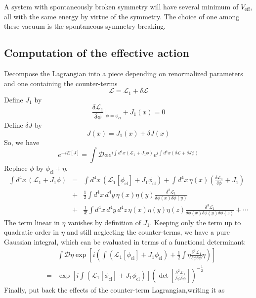A system with spontaneously broken symmetry will have several minimum of $V_{\mathrm{eff}}$, all with the same energy by virtue of the symmetry. The choice of one among these vacuum is the spontaneous symmetry breaking.

\subsection{Computation of the effective action}
\noindent
Decompose the Lagrangian into a piece depending on renormalized parameters and one containing the counter-terms
\[\mathcal{L} = \mathcal{L}_1 + \delta \mathcal{L}\]
Define $J_1$ by
\[\frac{\delta \mathcal{L}_1}{\delta \phi} |_{\phi = \phi_{\mathrm{cl}}} + J_1(x) = 0\]
Define $\delta J$ by
\[J(x) = J_1(x) + \delta J(x)\]
So, we have
\[e^{-iE[J]} = \int \mathcal{D}\phi e^{i\int d^4x (\mathcal{L}_1 + J_1\phi)} e^{i\int d^4x (\delta \mathcal{L} + \delta J \phi)}\]
Replace $\phi$ by $\phi_{\mathrm{cl}}+\eta$,
\begin{eqnarray}
\int d^4x \, (\mathcal{L}_1 + J_1\phi) &=& \int d^4x \, (\mathcal{L}_1[\phi_{\mathrm{cl}}] + J_1\phi_{\mathrm{cl}}) + \int d^4x \, \eta(x) \left( \frac{\delta \mathcal{L}_1}{\delta \phi} + J_1 \right) \nonumber \\
&+& \frac{1}{2} \int d^4x \, d^4y \, \eta(x) \eta(y) \frac{\delta^2 \mathcal{L}_1}{\delta \phi(x) \delta \phi(y)} \nonumber \\
&+& \frac{1}{3!} \int d^4x \, d^4y \, d^4z \, \eta(x) \eta(y) \eta(z) \frac{\delta^3 \mathcal{L}_1}{\delta \phi(x) \delta \phi(y) \delta \phi(z)} + \cdots \nonumber
\end{eqnarray}
The term linear in $\eta$ vanishes by definition of $J_1$.  Keeping only the term up to quadratic order in $\eta$ and still neglecting the counter-terms, we have a pure Gaussian integral, which can be evaluated in terms of a functional determinant:
\begin{eqnarray}
&&\int \mathcal{D}\eta \exp \left[ i \left( \int ( \mathcal{L}_1 [\phi_{\mathrm{cl}}] + J_1\phi_{\mathrm{cl}} ) +  \frac{1}{2} \int \eta \frac{\delta^2 \mathcal{L}_1}{\delta \phi \delta \phi} \eta \right) \right] \nonumber \\
&=& \exp \left[ i \int ( \mathcal{L}_1 [\phi_{\mathrm{cl}}] + J_1\phi_{\mathrm{cl}} )\right] \left( \det \left[  \frac{\delta^2 \mathcal{L}_1}{\delta \phi \delta \phi} \right] \right) ^{-\frac{1}{2}} \nonumber
\end{eqnarray}
Finally, put back the effects of the counter-term Lagrangian,writing it as
